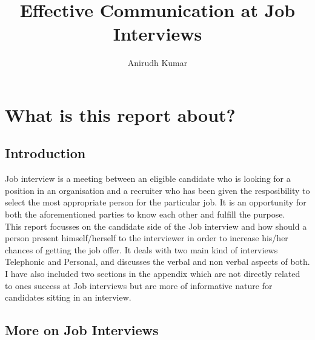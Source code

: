 \documentclass[a4paper,12pt]{report}
\title{Effective Communication at Job Interviews}
\author{Anirudh Kumar}
\begin{document}
\maketitle

\tableofcontents

\chapter{What is this report about?}             %
\section{Introduction}             %
Job interview is a meeting between an eligible candidate who is looking for a position in an organisation and a recruiter who has been 
given the resposibility to select the most appropriate person for the particular job. It is an opportunity for both the aforementioned 
parties to know each other and fulfill the purpose. \\This report focusses on the candidate side of the Job interview and how should a person
present himself/herself to the interviewer in order to increase his/her chances of getting the job offer. It deals with two
main kind of interviews Telephonic and Personal, and discusses the verbal and non verbal aspects of both.\\
I have also included two sections in the appendix which are not directly related to ones success at Job interviews
but are more of informative nature for candidates sitting in an interview.
\newpage
\section{More on Job Interviews}       %
\end{document}
